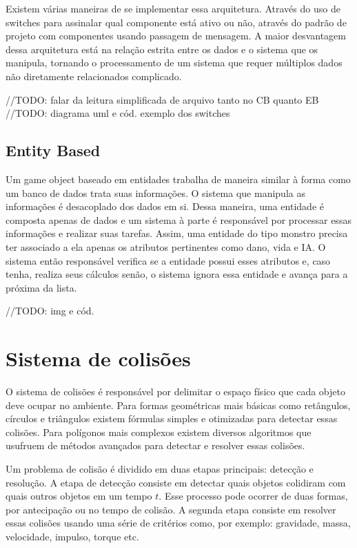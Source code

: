 \documentclass[12pt, 
openright, 
oneside, 
a4paper,    
brazil]{facom-ufu-abntex2}
\begin{document}
Existem várias maneiras de se implementar essa arquitetura. Através do uso de switches para assinalar qual componente está ativo ou não, através do padrão de projeto com componentes usando passagem de mensagem. A maior desvantagem dessa arquitetura está na relação estrita entre os dados e o sistema que os manipula, tornando o processamento de um sistema que requer múltiplos dados não diretamente relacionados complicado.

//TODO: falar da leitura simplificada de arquivo tanto no CB quanto EB
//TODO: diagrama uml e cód. exemplo dos switches


\subsection{Entity Based}
Um game object baseado em entidades trabalha de maneira similar à forma como um banco de dados trata suas informações. O sistema que manipula as informações é desacoplado dos dados em si. Dessa maneira, uma entidade é composta apenas de dados e um sistema à parte é responsável por processar essas informações e realizar suas tarefas.
Assim, uma entidade do tipo monstro precisa ter associado a ela apenas os atributos pertinentes como dano, vida e IA. O sistema então responsável verifica se a entidade possui esses atributos e, caso tenha, realiza seus cálculos senão, o sistema ignora essa entidade e avança para a próxima da lista.

//TODO: img e cód.

\section{Sistema de colisões}

O sistema de colisões é responsável por delimitar o espaço físico que cada objeto deve ocupar no ambiente. Para formas geométricas mais básicas como retângulos, círculos e triângulos existem fórmulas simples e otimizadas para detectar essas colisões. Para polígonos mais complexos existem diversos algoritmos que usufruem de métodos avançados para detectar e resolver essas colisões.

Um problema de colisão é dividido em duas etapas principais: detecção e resolução. A etapa de detecção consiste em detectar quais objetos colidiram com quais outros objetos em um tempo $t$. Esse processo pode ocorrer de duas formas, por antecipação ou no tempo de colisão. A segunda etapa consiste em resolver essas colisões usando uma série de critérios como, por exemplo: gravidade, massa, velocidade, impulso, torque etc.
\end{document}
